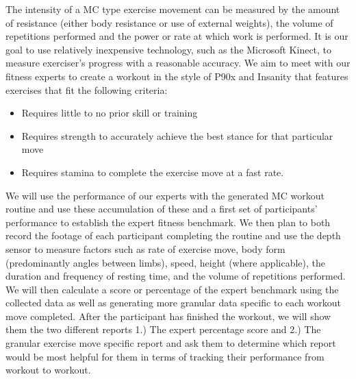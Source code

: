 The intensity of a MC type exercise movement can be measured by the amount of resistance (either body resistance or use of external weights), the volume of repetitions performed and the power or rate at which work is performed. It is our goal to use relatively inexpensive technology, such as the Microsoft Kinect, to measure exerciser’s progress with a reasonable accuracy.
We aim to meet with our fitness experts to create a workout in the style of P90x and Insanity that features exercises that fit the following criteria:
\begin{itemize}
	\item Requires little to no prior skill or training 
	\item Requires strength to accurately achieve the best stance for that particular move
	\item Requires stamina to complete the exercise move at a fast rate.
\end{itemize}
We will use the performance of our experts with the generated MC workout routine and use these accumulation of these and a first set of participants' performance to establish the expert fitness benchmark.  We then plan to both record the footage of each participant completing the routine and use the depth sensor to measure factors such as rate of exercise move, body form (predominantly angles between limbs), speed, height (where applicable), the duration and frequency of resting time, and the volume of repetitions performed.  We will then calculate a score or percentage of the expert benchmark using the collected data as well as generating more granular data specific to each workout move completed.  After the participant has finished the workout, we will show them the two different reports 1.) The expert percentage score and 2.) The granular exercise move specific report and ask them to determine which report would be most helpful for them in terms of tracking their performance from workout to workout.